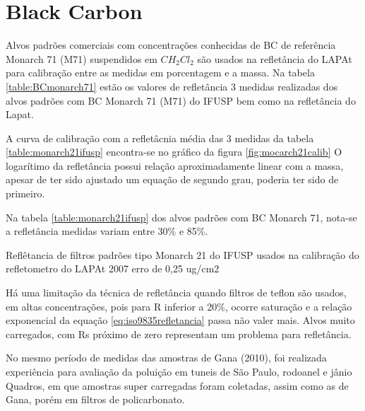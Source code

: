 \section{Black Carbon}

Alvos padrões comerciais com concentrações conhecidas de BC de referência 
Monarch 71 (M71) suspendidos em $CH_2Cl_2$ \citep{clarke1986} são usados na 
refletância do LAPAt para calibração entre as medidas em porcentagem e a massa.
Na tabela \ref{table:BCmonarch71} estão os valores de refletância 3 medidas realizadas 
dos alvos padrões com BC Monarch 71 (M71) do IFUSP bem como
na refletância do Lapat. 

A curva de calibração com a refletâcnia média das 3 medidas da tabela 
\ref{table:monarch21ifusp} encontra-se no gráfico da figura 
\ref{fig:mocarch21calib}
O logarítimo da refletância possui relação aproximadamente linear com a massa, 
apesar de ter sido ajustado um equação de segundo grau, poderia ter sido de 
primeiro. 


Na tabela \ref{table:monarch21ifusp} dos alvos padrões com BC Monarch 71, 
nota-se a refletância medidas variam entre 30\% e 85\%.


\newpage
\begin{table}[H]
  \centering
  \small
    
    \caption{Reflêtancia de filtros padrões tipo Monarch 21 \citep{clarke1986} 
           do IFUSP usados na calibração do refletometro do 
           LAPAt 2007  erro de 0,25 ug/cm2 \label{table:BCmonarch71}}
\end{table} 
\newpage






Há uma limitação da técnica de refletância quando filtros de teflon são usados, 
em altas concentrações, pois para R inferior a 20\%, ocorre saturação
e a relação exponencial da equação \ref{eq:iso9835refletancia} 
passa não valer mais\citep{taha2007}. Alvos muito carregados, 
com Rs próximo de zero representam um problema para refletância. 

No mesmo período de medidas das amostras de Gana (2010), foi realizada 
experiência para avaliação da poluição em tuneis de São Paulo, 
rodoanel e jânio Quadros, em que amostras super carregadas foram coletadas, 
assim como as de Gana, porém em filtros de policarbonato.
 
